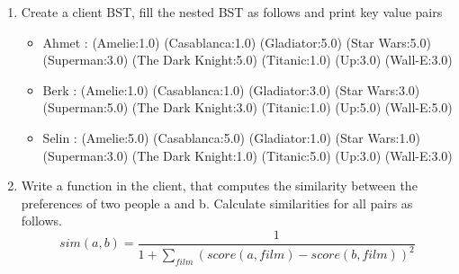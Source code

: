 \documentclass{article}
\begin{document}
\begin{enumerate}
\item Create a client BST, fill the nested BST as follows and print key value pairs 
\begin{itemize}
\item Ahmet : (Amelie:1.0)  (Casablanca:1.0)  (Gladiator:5.0)  (Star Wars:5.0)  (Superman:3.0)  (The Dark Knight:5.0)  (Titanic:1.0)  (Up:3.0)  (Wall-E:3.0) 
\item
Berk : (Amelie:1.0)  (Casablanca:1.0)  (Gladiator:3.0)  (Star Wars:3.0)  (Superman:5.0)  (The Dark Knight:3.0)  (Titanic:1.0)  (Up:5.0)  (Wall-E:5.0) 
\item
Selin : (Amelie:5.0)  (Casablanca:5.0)  (Gladiator:1.0)  (Star Wars:1.0)  (Superman:3.0)  (The Dark Knight:1.0)  (Titanic:5.0)  (Up:3.0)  (Wall-E:3.0) 
\end{itemize}

\item Write a function in the client, that computes the similarity between the preferences of two people a and b. Calculate similarities for all pairs as follows.
$$
sim(a,b) = \frac{1}{1 + \sum_{film} (score(a, film) - score(b, film))
^2}
$$ 

\end{enumerate}
\end{document}
